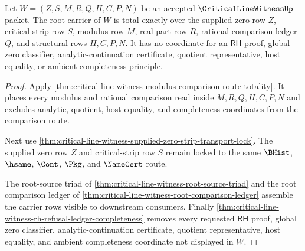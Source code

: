 \begin{theorem}
\label{thm:critical-line-witness-zero-strip-carrier-totality}
Let $W=(Z,S,M,R,Q,H,C,P,N)$ be an accepted $\CriticalLineWitnessUp$ packet. The root carrier of $W$ is total exactly over the supplied zero row $Z$, critical-strip row $S$, modulus row $M$, real-part row $R$, rational comparison ledger $Q$, and structural rows $H,C,P,N$. It has no coordinate for an $\mathsf{RH}$ proof, global zero classifier, analytic-continuation certificate, quotient representative, host equality, or ambient completeness principle.
\end{theorem}
\begin{proof}
Apply \autoref{thm:critical-line-witness-modulus-comparison-route-totality}. It places every modulus and rational comparison read inside $M,R,Q,H,C,P,N$ and excludes analytic, quotient, host-equality, and completeness coordinates from the comparison route.

Next use \autoref{thm:critical-line-witness-supplied-zero-strip-transport-lock}. The supplied zero row $Z$ and critical-strip row $S$ remain locked to the same $\BHist$, $\hsame$, $\Cont$, $\Pkg$, and $\NameCert$ route.

The root-source triad of \autoref{thm:critical-line-witness-root-source-triad} and the root comparison ledger of \autoref{thm:critical-line-witness-root-comparison-ledger} assemble the carrier rows visible to downstream consumers. Finally \autoref{thm:critical-line-witness-rh-refusal-ledger-completeness} removes every requested $\mathsf{RH}$ proof, global zero classifier, analytic-continuation certificate, quotient representative, host equality, and ambient completeness coordinate not displayed in $W$.
\end{proof}


